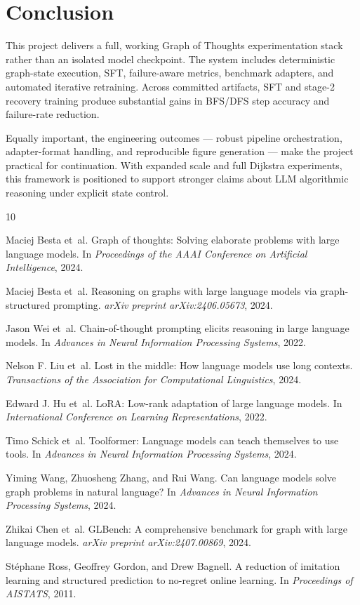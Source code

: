 \documentclass[sigplan,screen]{acmart}
\begin{document}
\section{Conclusion}
This project delivers a full, working Graph of Thoughts experimentation stack rather than an isolated model checkpoint.
The system includes deterministic graph-state execution, SFT, failure-aware metrics, benchmark adapters, and automated iterative retraining.
Across committed artifacts, SFT and stage-2 recovery training produce substantial gains in BFS/DFS step accuracy and failure-rate reduction.

Equally important, the engineering outcomes --- robust pipeline orchestration, adapter-format handling, and reproducible figure generation --- make the project practical for continuation.
With expanded scale and full Dijkstra experiments, this framework is positioned to support stronger claims about LLM algorithmic reasoning under explicit state control.

\begin{thebibliography}{10}

Maciej Besta et~al.
\newblock Graph of thoughts: Solving elaborate problems with large language models.
\newblock In \emph{Proceedings of the AAAI Conference on Artificial Intelligence}, 2024.

Maciej Besta et~al.
\newblock Reasoning on graphs with large language models via graph-structured prompting.
\newblock \emph{arXiv preprint arXiv:2406.05673}, 2024.

Jason Wei et~al.
\newblock Chain-of-thought prompting elicits reasoning in large language models.
\newblock In \emph{Advances in Neural Information Processing Systems}, 2022.

Nelson F. Liu et~al.
\newblock Lost in the middle: How language models use long contexts.
\newblock \emph{Transactions of the Association for Computational Linguistics}, 2024.

Edward J. Hu et~al.
\newblock LoRA: Low-rank adaptation of large language models.
\newblock In \emph{International Conference on Learning Representations}, 2022.

Timo Schick et~al.
\newblock Toolformer: Language models can teach themselves to use tools.
\newblock In \emph{Advances in Neural Information Processing Systems}, 2024.

Yiming Wang, Zhuosheng Zhang, and Rui Wang.
\newblock Can language models solve graph problems in natural language?
\newblock In \emph{Advances in Neural Information Processing Systems}, 2024.

Zhikai Chen et~al.
\newblock GLBench: A comprehensive benchmark for graph with large language models.
\newblock \emph{arXiv preprint arXiv:2407.00869}, 2024.

St\'ephane Ross, Geoffrey Gordon, and Drew Bagnell.
\newblock A reduction of imitation learning and structured prediction to no-regret online learning.
\newblock In \emph{Proceedings of AISTATS}, 2011.

\end{thebibliography}
\end{document}
